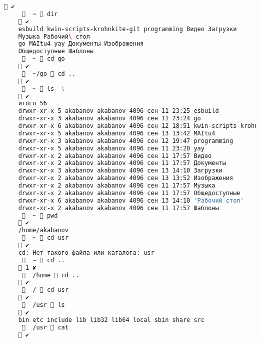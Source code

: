\begin{lstlisting}[language=bash]
	 ✔
	     ~  dir
	 ✔
	esbuild kwin-scripts-krohnkite-git programming Видео Загрузки
	Музыка Рабочий\ стол
	go MAItu4 yay Документы Изображения
	Общедоступные Шаблоны
	     ~  cd go
	 ✔
	     ~/go  cd ..
	 ✔
	     ~  ls -l
	 ✔
	итого 56
	drwxr-xr-x 5 akabanov akabanov 4096 сен 11 23:25 esbuild
	drwxr-xr-x 3 akabanov akabanov 4096 сен 11 23:24 go
	drwxr-xr-x 6 akabanov akabanov 4096 сен 12 18:51 kwin-scripts-krohnkite-git
	drwxr-xr-x 5 akabanov akabanov 4096 сен 13 13:42 MAItu4
	drwxr-xr-x 3 akabanov akabanov 4096 сен 12 19:47 programming
	drwxr-xr-x 5 akabanov akabanov 4096 сен 11 23:20 yay
	drwxr-xr-x 2 akabanov akabanov 4096 сен 11 17:57 Видео
	drwxr-xr-x 2 akabanov akabanov 4096 сен 11 17:57 Документы
	drwxr-xr-x 3 akabanov akabanov 4096 сен 13 14:10 Загрузки
	drwxr-xr-x 2 akabanov akabanov 4096 сен 13 13:52 Изображения
	drwxr-xr-x 2 akabanov akabanov 4096 сен 11 17:57 Музыка
	drwxr-xr-x 2 akabanov akabanov 4096 сен 11 17:57 Общедоступные
	drwxr-xr-x 6 akabanov akabanov 4096 сен 13 14:10 'Рабочий стол'
	drwxr-xr-x 2 akabanov akabanov 4096 сен 11 17:57 Шаблоны
	     ~  pwd
	 ✔
	/home/akabanov
	     ~  cd usr
	 ✔
	cd: Нет такого файла или каталога: usr
	     ~  cd ..
	 1 ✘
	     /home  cd ..
	 ✔
	     /  cd usr
	 ✔
	     /usr  ls
	 ✔
	bin etc include lib lib32 lib64 local sbin share src
	     /usr  cat
	 ✔
	
\end{lstlisting}